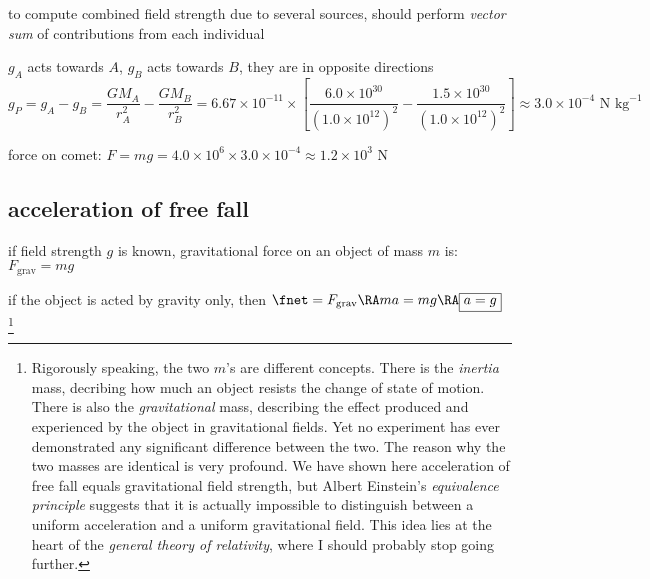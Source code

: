 to compute combined field strength due to several sources, should perform \emph{vector sum} of contributions from each individual


\begin{center}
\end{center}

\sol $g_A$ acts towards $A$, $g_B$ acts towards $B$, they are in opposite directions
\begin{equation*}
	g_P = g_A - g_B = \frac{GM_A}{r_A^2} - \frac{GM_B}{r_B^2} = 6.67\times10^{-11} \times\left[ \frac{6.0\times10^{30}}{(1.0\times10^{12})^2} - \frac{1.5\times10^{30}}{(1.0\times10^{12})^2}\right] \approx 3.0\times10^{-4} \text{ N kg}^{-1}
\end{equation*}

force on comet: $F=mg = 4.0\times10^6 \times 3.0\times10^{-4} \approx 1.2\times10^3 \text{ N}$ \eoe

\subsection{acceleration of free fall}

if field strength $g$ is known, gravitational force on an object of mass $m$ is: $F_\text{grav} = mg$

if the object is acted by gravity only, then $\fnet = F_\text{grav} \RA ma = mg \RA \boxed{a=g}$
\footnote{Rigorously speaking, the two $m$'s are different concepts. There is the \emph{inertia} mass, decribing how much an object resists the change of state of motion. There is also the \emph{gravitational} mass, describing the effect produced and experienced by the object in gravitational fields. Yet no experiment has ever demonstrated any significant difference between the two. The reason why the two masses are identical is very profound. We have shown here acceleration of free fall equals gravitational field strength, but Albert Einstein's \emph{equivalence principle} suggests that it is actually impossible to distinguish between a uniform acceleration and a uniform gravitational field. This idea lies at the heart of the \emph{general theory of relativity}, where I should probably stop going further.}

